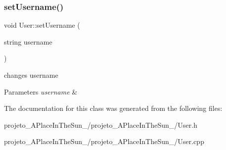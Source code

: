 \subsubsection{\texorpdfstring{set\+Username()}{setUsername()}}
{\footnotesize\ttfamily void User\+::set\+Username (\begin{DoxyParamCaption}\item[{string}]{username }\end{DoxyParamCaption})\hspace{0.3cm}{\ttfamily [inline]}}



changes username 


\begin{DoxyParams}{Parameters}
{\em username} & \\
\hline
\end{DoxyParams}


The documentation for this class was generated from the following files\+:\begin{DoxyCompactItemize}
\item 
projeto\+\_\+\+A\+Place\+In\+The\+Sun\+\_/projeto\+\_\+\+A\+Place\+In\+The\+Sun\+\_/User.\+h\item 
projeto\+\_\+\+A\+Place\+In\+The\+Sun\+\_/projeto\+\_\+\+A\+Place\+In\+The\+Sun\+\_/User.\+cpp\end{DoxyCompactItemize}
